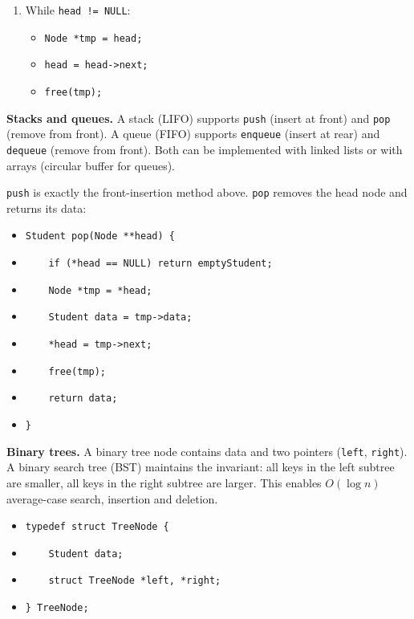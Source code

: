 \documentclass[11pt]{article}
\newcommand{\cle}[1]{{\popxbold\color{popdark}#1}}
\begin{document}
\begin{methode}
\begin{enumerate}
\item While \texttt{head != NULL}:
  \begin{itemize}
  \item \texttt{Node *tmp = head;}
  \item \texttt{head = head->next;}
  \item \texttt{free(tmp);}
  \end{itemize}
\end{enumerate}
\end{methode}

\textbf{Stacks and queues.} A \cle{stack} (LIFO) supports \texttt{push} (insert at front) and \texttt{pop} (remove from front). A \cle{queue} (FIFO) supports \texttt{enqueue} (insert at rear) and \texttt{dequeue} (remove from front). Both can be implemented with linked lists or with arrays (circular buffer for queues).

\begin{exemplebox}
\texttt{push} is exactly the front-insertion method above. \texttt{pop} removes the head node and returns its data:
\begin{itemize}
\item \texttt{Student pop(Node **head) \{}
\item \texttt{~~~~if (*head == NULL) return emptyStudent;}
\item \texttt{~~~~Node *tmp = *head;}
\item \texttt{~~~~Student data = tmp->data;}
\item \texttt{~~~~*head = tmp->next;}
\item \texttt{~~~~free(tmp);}
\item \texttt{~~~~return data;}
\item \texttt{\}}
\end{itemize}
\end{exemplebox}

\textbf{Binary trees.} A \cle{binary tree} node contains data and two pointers (\texttt{left}, \texttt{right}). A \cle{binary search tree (BST)} maintains the invariant: all keys in the left subtree are smaller, all keys in the right subtree are larger. This enables $O(\log n)$ average-case search, insertion and deletion.

\begin{definition}
\begin{itemize}
\item \texttt{typedef struct TreeNode \{}
\item \texttt{~~~~Student data;}
\item \texttt{~~~~struct TreeNode *left, *right;}
\item \texttt{\} TreeNode;}
\end{itemize}
\end{definition}
\end{document}
